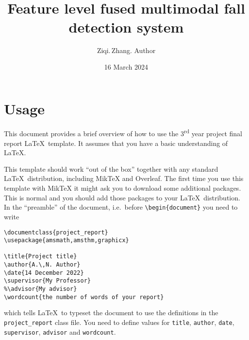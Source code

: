 \documentclass[12pt]{project_report}
\title{Feature level fused multimodal fall detection system}
\author{Ziqi.\,Zhang. Author}
\date{16 March 2024}
\begin{document}
\coverpage
\declaration
\maketitle
{}

\tableofcontents
\section{Usage}
This document provides a brief overview of how to use the 3\textsuperscript{rd} year project final report \LaTeX\ template. It assumes that you have a basic understanding of \LaTeX.

This template should work ``out of the box'' together with any standard \LaTeX\ distribution, including MikTeX and Overleaf. The first time you use this template with MikTeX it might ask you to download some additional packages. This is normal and you should add those packages to your \LaTeX\ distribution. In the ``preamble'' of the document, i.e.\ before \verb!\begin{document}! you need to write
\begin{verbatim}
\documentclass{project_report}
\usepackage{amsmath,amsthm,graphicx}

\title{Project title}
\author{A.\,N. Author}
\date{14 December 2022}
\supervisor{My Professor}
%\advisor{My advisor}
\wordcount{the number of words of your report}
\end{verbatim}
which tells \LaTeX\ to typeset the document to use the definitions in the \verb!project_report! class file. You need to define values for \verb!title!, \verb!author!, \verb!date!, \verb!supervisor!, \verb!advisor! and \verb!wordcount!.
\end{document}
